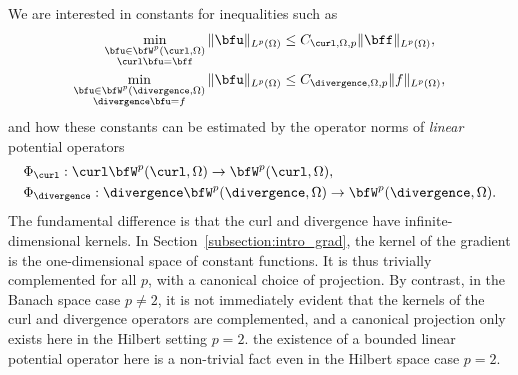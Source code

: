 We are interested in constants for inequalities such as 
\begin{align}\label{math:pot_PF_curl_div}
    \min\limits_{ \substack{ \bfu \in \bfW^{p}(\curl,\Omega) \\ \curl \bfu = \bff } } 
    \| \bfu \|_{L^{p}(\Omega)}
    &\leq 
    C_{\curl,\Omega,p}
    \| \bff \|_{L^{p}(\Omega)} \label{math:pot_PF_curl}
    ,
    \\
    \min\limits_{ \substack{ \bfu \in \bfW^{p}(\divergence,\Omega) \\ \divergence \bfu = f } } 
    \| \bfu \|_{L^{p}(\Omega)}
    &\leq 
    C_{\divergence,\Omega,p}
    \| f \|_{L^{p}(\Omega)} \label{math:pot_PF_div}
    ,
\end{align}
and how these constants can be estimated by the operator norms of \emph{linear} potential operators 
\begin{align*}
    &\Phi_{\curl} : \curl \bfW^{p}(\curl,\Omega) \rightarrow \bfW^{p}(\curl,\Omega)
    ,
    \\
    &\Phi_{\divergence} : \divergence \bfW^{p}(\divergence,\Omega) \rightarrow \bfW^{p}(\divergence,\Omega)
    .
\end{align*}
The fundamental difference  is that the curl and divergence have infinite-dimensional kernels. In Section~\ref{subsection:intro_grad}, the kernel of the gradient is the one-dimensional space of constant functions. It is thus trivially complemented for all $p$, with a canonical choice of projection. By contrast, in the Banach space case $p \neq 2$, it is not immediately evident that the kernels of the curl and divergence operators are complemented, and a canonical projection only exists here in the Hilbert setting $p=2$.  the existence of a bounded linear potential operator here is a non-trivial fact even in the Hilbert space case $p = 2$. 

